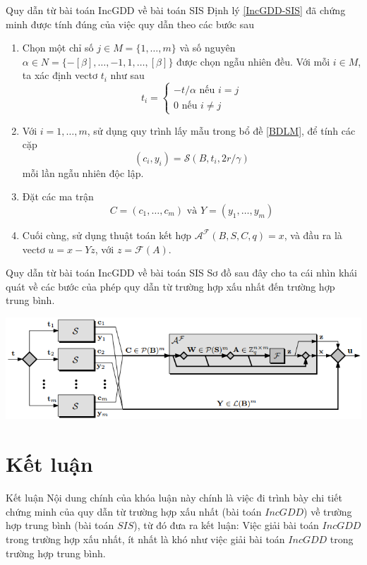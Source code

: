 \documentclass[notheorems,envcountsect,serif,12pt]{beamer}
\newcommand{\heva}[1]{\left\{\begin{aligned}#1\end{aligned}\right.}
\numberwithin{equation}{section}
\theoremstyle{definition}
\numberwithin{equation}{section}
\begin{document}
\begin{frame}{Quy dẫn từ bài toán IncGDD về bài toán SIS}
	Định lý \ref{IncGDD-SIS} đã chứng minh được tính đúng của việc quy dẫn theo các bước sau
	\begin{enumerate}
		\item Chọn một chỉ số $j\in M=\{1,\ldots,m\}$ và số nguyên $\alpha\in N=\{-[\beta], \ldots, -1,1,\ldots, [\beta]\}$ được chọn ngẫu nhiên đều. Với mỗi $i\in M$, ta xác định vectơ $t_i$ như sau $$t_i=\heva{-t/\alpha \text{ nếu }i=j\\ 0 \text{ nếu } i\ne j}$$
		\item Với $i=1,\ldots,m$, sử dụng quy trình lấy mẫu trong bổ đề \ref{BDLM}, để tính các cặp $$(c_i, y_i)=\mathcal{S}(B, t_i, 2r/\gamma)$$ mỗi lần ngẫu nhiên độc lập.
		\item Đặt các ma trận $$C=\left(c_1,\ldots, c_m\right) \text{ và } Y=\left(y_1,\ldots, y_m\right)$$
		\item Cuối cùng, sử dụng thuật toán kết hợp $\mathcal{A}^{\mathcal{F}}(B, S, C, q)=x$, và đầu ra là vectơ $u=x-Yz$, với $z=\mathcal{F}(A)$.
	\end{enumerate}
\end{frame}
\begin{frame}{Quy dẫn từ bài toán IncGDD về bài toán SIS}
	Sơ đồ sau đây cho ta cái nhìn khái quát về các bước của phép quy dẫn từ trường hợp xấu nhất đến trường hợp trung bình.
	
	\begin{center}
		\includegraphics[scale=0.6]{Dinhly_1}
	\end{center}
\end{frame}
\section{Kết luận}
\begin{frame}{Kết luận}
	Nội dung chính của khóa luận này chính là việc đi trình bày chi tiết chứng minh của quy dẫn từ trường hợp xấu nhất (bài toán $IncGDD$) về trường hợp trung bình (bài toán $SIS$), từ đó đưa ra kết luận: Việc giải bài toán $IncGDD$ trong trường hợp xấu nhất, ít nhất là khó như việc giải bài toán $IncGDD$ trong trường hợp trung bình.
\end{frame}
\end{document}
